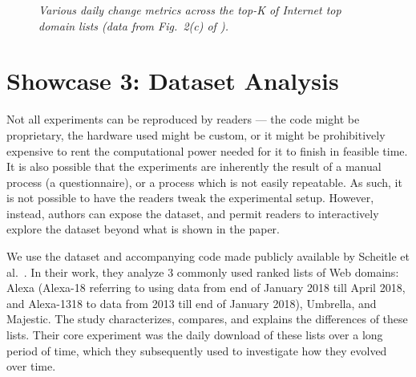 \begin{figure*}[t]
    
    
	\centering
	\hfill%
 	\hfill%
	\vspace{-2pt}%
	\caption{\small \em Various daily change metrics across the top-K of Internet top domain lists (data from Fig.~2(c) of \cite{top-lists}).}
	\label{fig:toplists}
	\vspace{-6pt}
\end{figure*}

\section{Showcase 3: Dataset Analysis}
\label{sec:dataset-analysis}

Not all experiments can be reproduced by readers --- the code might be proprietary, the hardware used might be custom, or it might be prohibitively expensive to rent the computational power needed for it to finish in feasible time. It is also possible that the experiments are inherently the result of a manual process (\eg a questionnaire), or a process which is not easily repeatable. As such, it is not possible to have the readers tweak the experimental setup. However, instead, authors can expose the dataset, and permit readers to interactively explore the dataset beyond what is shown in the paper.

We use the dataset and accompanying code made publicly available by Scheitle et al.~\cite{top-lists}. In their work, they analyze 3 commonly used ranked lists of Web domains: Alexa (Alexa-18 referring to using data from end of January 2018 till April 2018, and Alexa-1318 to data from 2013 till end of January 2018), Umbrella, and Majestic. The study characterizes, compares, and explains the differences of these lists. Their core experiment was the daily download of these lists over a long period of time, which they subsequently used to investigate how they evolved over time.

